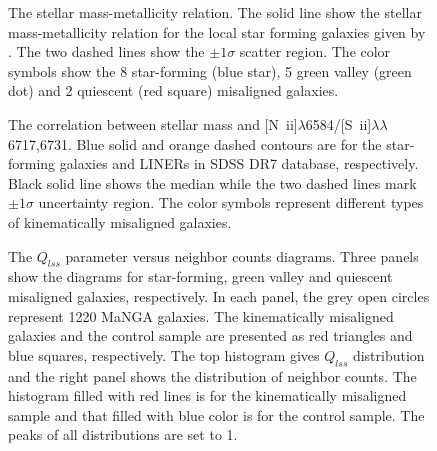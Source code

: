 \documentclass[a4paper,fleqn,usenatbib]{mnras}
\newcommand{\nii}{[{N~\sc ii}]$\lambda$6584}
\newcommand{\sii}{[{S~\sc ii}]$\lambda\lambda$6717,6731}
\begin{document}
\begin{figure}
  \begin{center}
    
  \end{center}
  \caption{The stellar mass-metallicity relation. The solid line show the stellar mass-metallicity relation for the local star forming galaxies given by \protect\cite{Tremonti-04}. The two dashed lines show the $\pm1\sigma$ scatter region. The color symbols show the 8 star-forming (blue star), 5 green valley (green dot) and 2 quiescent (red square) misaligned galaxies.}
  \label{fig:metal}
\end{figure}

\begin{figure}
  \begin{center}
    
  \end{center}
  \caption{The correlation between stellar mass and \nii/\sii. Blue solid and orange dashed contours are for the star-forming galaxies and LINERs in SDSS DR7 database, respectively. Black solid line shows the median while the two dashed lines mark $\pm 1\sigma$ uncertainty region. The color symbols represent different types of kinematically misaligned galaxies.}
  \label{fig:mz}
\end{figure}

\begin{figure}
  \begin{center}
    
  \end{center}
  \caption{The $Q_{lss}$ parameter versus neighbor counts diagrams. Three panels show the diagrams for star-forming, green valley and quiescent misaligned galaxies, respectively. In each panel, the grey open circles represent 1220 MaNGA galaxies. The kinematically misaligned galaxies and the control sample are presented as red triangles and blue squares, respectively. The top histogram gives $Q_{lss}$ distribution and the right panel shows the distribution of neighbor counts. The histogram filled with red lines is for the kinematically misaligned sample and that filled with blue color is for the control sample. The peaks of all distributions are set to 1.}
  \label{fig:qlss}
\end{figure}



\bsp	%
\label{lastpage}
\end{document}
